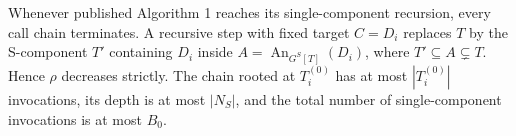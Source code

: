 Whenever published Algorithm 1 reaches its single-component recursion, every call chain terminates. A recursive step with fixed target \(C=D_i\) replaces \(T\) by the S-component \(T'\) containing \(D_i\) inside \(A=\operatorname{An}_{G^S[T]}(D_i)\), where \(T'\subseteq A\subsetneq T\). Hence \(\rho\) decreases strictly. The chain rooted at \(T_i^{(0)}\) has at most \(|T_i^{(0)}|\) invocations, its depth is at most \(|N_S|\), and the total number of single-component invocations is at most \(B_0\).